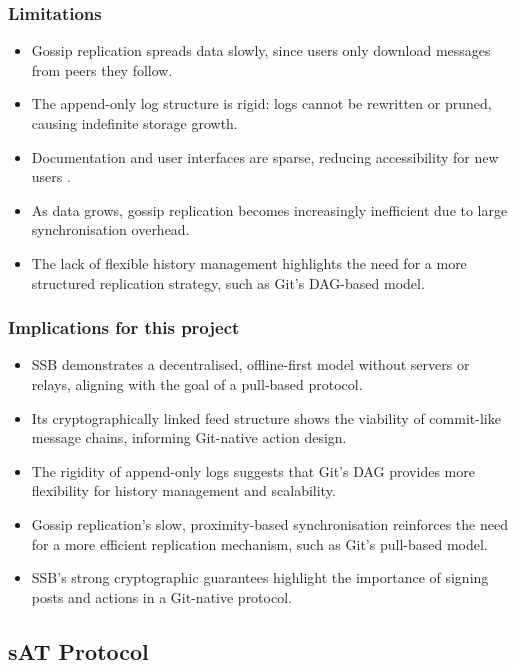 \subsubsection{Limitations}
\begin{itemize}
    \item Gossip replication spreads data slowly, since users only download messages from peers they follow.
    \item The append-only log structure is rigid: logs cannot be rewritten or pruned, causing indefinite storage growth.
    \item Documentation and user interfaces are sparse, reducing accessibility for new users \cite{clebertechSSB2026}.
    \item As data grows, gossip replication becomes increasingly inefficient due to large synchronisation overhead.
    \item The lack of flexible history management highlights the need for a more structured replication strategy, such as Git’s DAG-based model.
\end{itemize}

\subsubsection{Implications for this project}
\begin{itemize}
    \item SSB demonstrates a decentralised, offline-first model without servers or relays, aligning with the goal of a pull-based protocol.
    \item Its cryptographically linked feed structure shows the viability of commit-like message chains, informing Git-native action design.
    \item The rigidity of append-only logs suggests that Git’s DAG provides more flexibility for history management and scalability.
    \item Gossip replication’s slow, proximity-based synchronisation reinforces the need for a more efficient replication mechanism, such as Git’s pull-based model.
    \item SSB’s strong cryptographic guarantees highlight the importance of signing posts and actions in a Git-native protocol.
\end{itemize}

\subsection{sAT Protocol}

